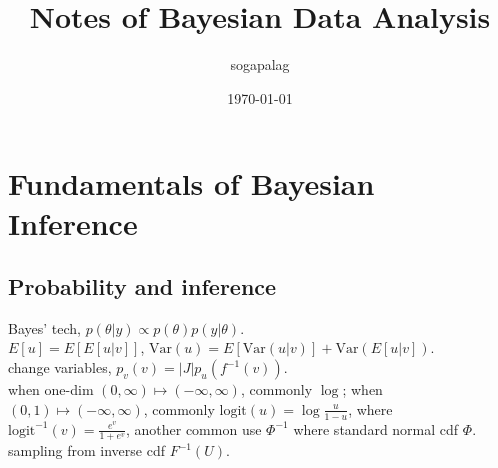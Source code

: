 \documentclass[paper=a4, fontsize=11pt]{scrartcl} %
\title{Notes of Bayesian Data Analysis}
\author{sogapalag}
\date{\normalsize\today}
\numberwithin{equation}{section} %
\numberwithin{figure}{section} %
\numberwithin{table}{section} %
\def \var {\text{Var}}
\def \logit {\text{logit}}
\begin{document}
\maketitle
\section{Fundamentals of Bayesian Inference}
\subsection{Probability and inference}
Bayes' tech, $p(\theta|y)\propto p(\theta)p(y|\theta)$.\\
$E[u]=E[E[u|v]]$,  $\var(u)=E[\var(u|v)] + \var(E[u|v])$.\\
change variables, $p_v(v) = |J|p_u(f^{-1}(v))$.\\
when one-dim $(0,\infty)\mapsto(-\infty,\infty)$, commonly $\log$; when $(0,1)\mapsto(-\infty,\infty)$, commonly $\logit(u)=\log\frac{u}{1-u}$, where $\logit^{-1}(v)=\frac{e^v}{1+e^v}$, another common use $\Phi^{-1}$ where standard normal cdf $\Phi$.\\
sampling from inverse cdf $F^{-1}(U)$.\\
\end{document}
